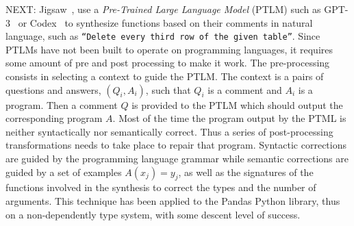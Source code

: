 \documentclass[]{report}
\begin{document}
NEXT: Jigsaw~\cite{Jain2022}, use a \emph{Pre-Trained Large Language
  Model} (PTLM) such as GPT-3~\cite{Brown2020} or
Codex~\cite{Chen2021} to synthesize functions based on their comments
in natural language, such as \texttt{``Delete every third row of the
  given table''}.  Since PTLMs have not been built to operate on
programming languages, it requires some amount of pre and post
processing to make it work.  The pre-processing consists in selecting
a context to guide the PTLM.  The context is a pairs of questions and
answers, $(Q_i, A_i)$, such that $Q_i$ is a comment and $A_i$ is a
program.  Then a comment $Q$ is provided to the PTLM which should
output the corresponding program $A$.  Most of the time the program
output by the PTML is neither syntactically nor semantically correct.
Thus a series of post-processing transformations needs to take place
to repair that program.  Syntactic corrections are guided by the
programming language grammar while semantic corrections are guided by
a set of examples $A(x_j)=y_j$, as well as the signatures of the
functions involved in the synthesis to correct the types and the
number of arguments.  This technique has been applied to the Pandas
Python library, thus on a non-dependently type system, with some
descent level of success.
\end{document}
